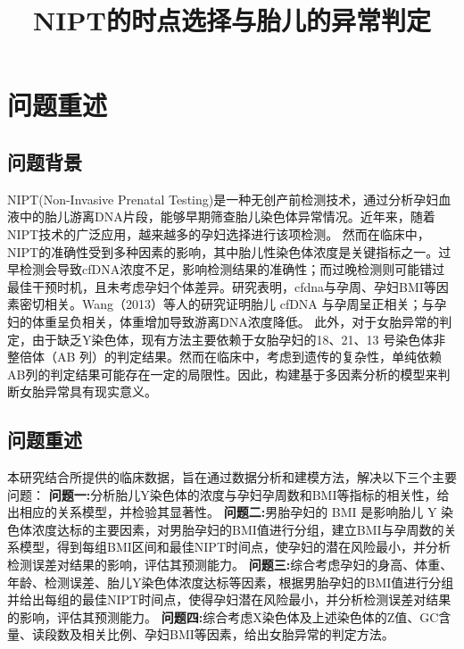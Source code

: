 \documentclass{cumcmthesis}
\title{NIPT的时点选择与胎儿的异常判定}
\begin{document}
\maketitle

\begin{abstract}
            
        \end{abstract}
        \section{问题重述}
        \subsection{问题背景}
        NIPT(Non-Invasive Prenatal Testing)是一种无创产前检测技术，通过分析孕妇血液中的胎儿游离DNA片段，能够早期筛查胎儿染色体异常情况。近年来，随着NIPT技术的广泛应用，越来越多的孕妇选择进行该项检测。
        \newline
        \hspace*{2em} 然而在临床中，NIPT的准确性受到多种因素的影响，其中胎儿性染色体浓度是关键指标之一。过早检测会导致cfDNA浓度不足，影响检测结果的准确性；而过晚检测则可能错过最佳干预时机，且未考虑孕妇个体差异。研究表明，cfdna与孕周、孕妇BMI等因素密切相关。Wang（2013）等人的研究证明胎儿 cfDNA 与孕周呈正相关；与孕妇的体重呈负相关，体重增加导致游离DNA浓度降低。
        \newline
        \hspace*{2em} 此外，对于女胎异常的判定，由于缺乏Y染色体，现有方法主要依赖于女胎孕妇的18、21、13 号染色体非整倍体（AB 列）的判定结果。然而在临床中，考虑到遗传的复杂性，单纯依赖AB列的判定结果可能存在一定的局限性。因此，构建基于多因素分析的模型来判断女胎异常具有现实意义。
        \subsection{问题重述}
        本研究结合所提供的临床数据，旨在通过数据分析和建模方法，解决以下三个主要问题：
        \newline
        \hspace*{2em}  \textbf{问题一:}分析胎儿Y染色体的浓度与孕妇孕周数和BMI等指标的相关性，给出相应的关系模型，并检验其显著性。
        \newline
        \hspace*{2em} \textbf{问题二:}男胎孕妇的 BMI 是影响胎儿 Y 染色体浓度达标的主要因素，对男胎孕妇的BMI值进行分组，建立BMI与孕周数的关系模型，得到每组BMI区间和最佳NIPT时间点，使孕妇的潜在风险最小，并分析检测误差对结果的影响，评估其预测能力。
        \newline
        \hspace*{2em} \textbf{问题三:}综合考虑孕妇的身高、体重、年龄、检测误差、胎儿Y染色体浓度达标等因素，根据男胎孕妇的BMI值进行分组并给出每组的最佳NIPT时间点，使得孕妇潜在风险最小，并分析检测误差对结果的影响，评估其预测能力。
        \newline
        \hspace*{2em} \textbf{问题四:}综合考虑X染色体及上述染色体的Z值、GC含量、读段数及相关比例、孕妇BMI等因素，给出女胎异常的判定方法。
\end{document}

